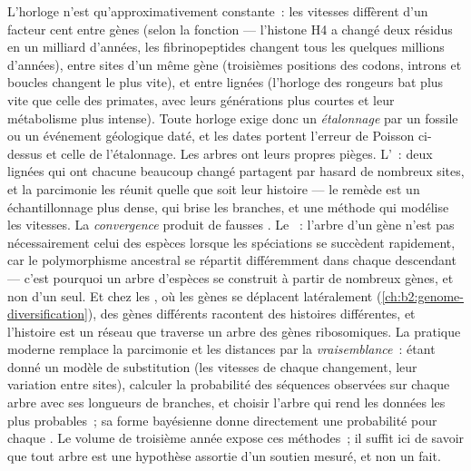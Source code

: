 \begin{proposition}\label{prop:b2:phylogenetic-trees:pitfalls}
L'horloge n'est qu'approximativement constante~: les vitesses diffèrent
d'un facteur cent entre gènes (selon la fonction --- l'histone H4 a changé
deux résidus en un milliard d'années, les fibrinopeptides changent tous
les quelques millions d'années), entre sites d'un même gène (troisièmes
positions des codons, introns et boucles changent le plus vite), et entre
lignées (l'horloge des rongeurs bat plus vite que celle des primates,
avec leurs générations plus courtes et leur métabolisme plus intense).
Toute horloge exige donc un
\emph{étalonnage} par un fossile ou un événement géologique daté, et les
dates portent l'erreur de Poisson ci-dessus et celle de l'étalonnage.
Les arbres ont leurs propres pièges. L'\emph{}~: deux lignées qui ont chacune beaucoup changé partagent par
hasard de nombreux sites, et la parcimonie les réunit quelle que soit leur
histoire --- le remède est un échantillonnage plus dense, qui brise les
branches, et une méthode qui modélise les vitesses. La \emph{convergence}
produit de fausses . Le \emph{}~:
l'arbre d'un gène n'est pas nécessairement celui des espèces lorsque les
spéciations se succèdent rapidement, car le polymorphisme ancestral se
répartit différemment dans chaque descendant
--- c'est pourquoi un arbre d'espèces se construit à partir de nombreux
gènes, et non d'un seul. Et chez les , où les gènes se
déplacent latéralement
(\cref{ch:b2:genome-diversification}), des gènes différents racontent
des histoires différentes, et l'histoire est un réseau que traverse un
arbre des gènes ribosomiques. La pratique moderne remplace la parcimonie
et les distances par la \emph{vraisemblance}~: étant donné un modèle de
substitution (les vitesses de chaque changement, leur variation entre
sites), calculer la probabilité des séquences observées sur chaque arbre
avec ses longueurs de branches, et choisir l'arbre qui rend les données
les plus probables~; sa forme bayésienne donne directement une probabilité
pour chaque . Le volume de troisième année expose ces méthodes~; il
suffit ici de savoir que tout arbre est une hypothèse assortie d'un
soutien mesuré, et non un fait.
\end{proposition}
